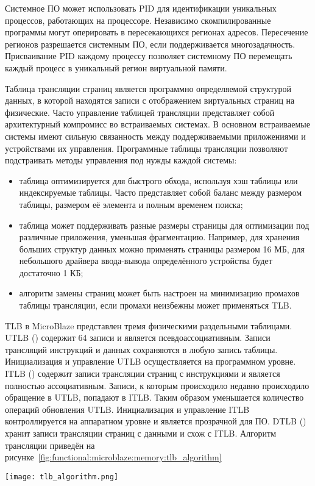 Системное ПО может использовать PID для идентификации уникальных процессов, работающих
на процессоре. Независимо скомпилированные программы могут оперировать
в пересекающихся регионах адресов. Пересечение регионов разрешается
системным ПО, если поддерживается многозадачность. Присваивание PID каждому процессу
позволяет системному ПО перемещать каждый процесс в уникальный регион виртуальной
памяти.

Таблица трансляции страниц является программно определяемой структурой данных,
в которой находятся записи с отображением виртуальных страниц на физические. Часто
управление таблицей трансляции представляет собой архитектурный компромисс во встраиваемых
системах. В основном встраиваемые системы имеют сильную связанность между поддерживаемыми
приложениями и устройствами их управления. Программные таблицы трансляции позволяют подстраивать
методы управления под нужды каждой системы:
\begin{itemize}
  \item таблица оптимизируется для быстрого обхода, используя хэш таблицы или
    индексируемые таблицы. Часто представляет собой баланс между размером таблицы,
    размером её элемента и полным временем поиска;
  \item таблица может поддерживать разные размеры страницы для оптимизации под различные
    приложения, уменьшая фрагментацию. Например, для хранения больших структур данных
    можно применять страницы размером 16 МБ, для небольшого драйвера ввода-вывода определённого
    устройства будет достаточно 1 КБ;
  \item алгоритм замены страниц может быть настроен на минимизацию промахов таблицы трансляции,
    если промахи неизбежны может применяться TLB.
\end{itemize}

TLB в MicroBlaze представлен тремя физическими раздельными таблицами.
UTLB () содержит 64 записи и является псевдоассоциативным. Записи трансляций
инструкций и данных сохраняются в любую запись таблицы. Инициализация и управление UTLB
осуществляется на программном уровне. ITLB () содержит
записи трансляции страниц с инструкциями и является полностью ассоциативным. Записи, к которым
происходило недавно происходило обращение в UTLB, попадают в ITLB. Таким образом уменьшается
количество операций обновления UTLB. Инициализация и управление ITLB контроллируется на аппаратном
уровне и является прозрачной для ПО. DTLB () хранит записи трансляции страниц с
данными и схож с ITLB. Алгоритм трансляции приведён на рисунке~\ref{fig:functional:microblaze:memory:tlb_algorithm}
\begin{center}
  \centering
  \texttt{[image: tlb\_algorithm.png]}
  \label{fig:functional:microblaze:memory:tlb_algorithm}
\end{center}

